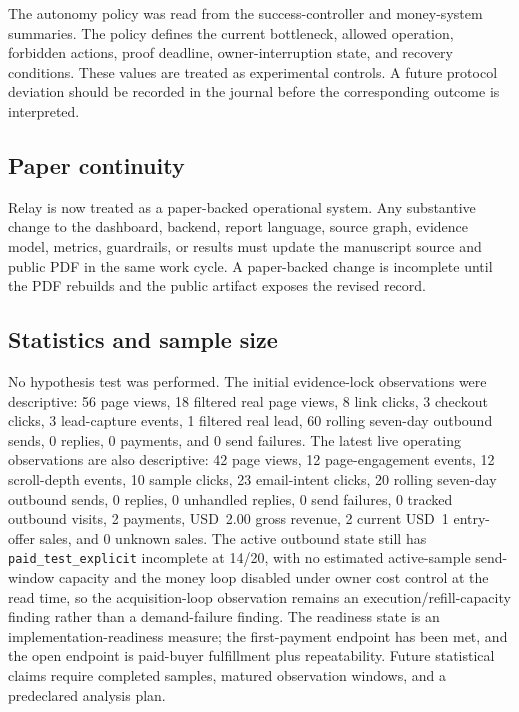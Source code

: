 \documentclass[12pt,letterpaper]{article}
\begin{document}
The autonomy policy was read from the success-controller and money-system summaries. The policy defines the current bottleneck, allowed operation, forbidden actions, proof deadline, owner-interruption state, and recovery conditions. These values are treated as experimental controls. A future protocol deviation should be recorded in the journal before the corresponding outcome is interpreted.

\subsection{Paper continuity}

Relay is now treated as a paper-backed operational system. Any substantive change to the dashboard, backend, report language, source graph, evidence model, metrics, guardrails, or results must update the manuscript source and public PDF in the same work cycle. A paper-backed change is incomplete until the PDF rebuilds and the public artifact exposes the revised record.

\subsection{Statistics and sample size}

No hypothesis test was performed. The initial evidence-lock observations were descriptive: 56 page views, 18 filtered real page views, 8 link clicks, 3 checkout clicks, 3 lead-capture events, 1 filtered real lead, 60 rolling seven-day outbound sends, 0 replies, 0 payments, and 0 send failures. The latest live operating observations are also descriptive: 42 page views, 12 page-engagement events, 12 scroll-depth events, 10 sample clicks, 23 email-intent clicks, 20 rolling seven-day outbound sends, 0 replies, 0 unhandled replies, 0 send failures, 0 tracked outbound visits, 2 payments, USD~2.00 gross revenue, 2 current USD~1 entry-offer sales, and 0 unknown sales. The active outbound state still has \texttt{paid\_test\_explicit} incomplete at 14/20, with no estimated active-sample send-window capacity and the money loop disabled under owner cost control at the read time, so the acquisition-loop observation remains an execution/refill-capacity finding rather than a demand-failure finding. The readiness state is an implementation-readiness measure; the first-payment endpoint has been met, and the open endpoint is paid-buyer fulfillment plus repeatability. Future statistical claims require completed samples, matured observation windows, and a predeclared analysis plan.
\end{document}
